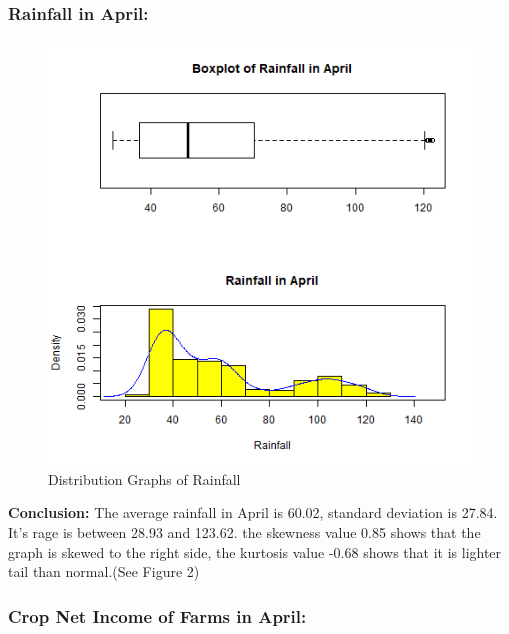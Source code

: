 \documentclass[12pt, a4paper]{article}
\begin{document}
\justify
\subsubsection{Rainfall in April:}

\begin{figure}[H]
\centering
\includegraphics[trim={0 0 0 2cm}, scale=0.6, clip]{RainFall.png}
\caption{Distribution Graphs of Rainfall}
\end{figure}

\justify
\textbf{Conclusion: }  The average rainfall in April is 60.02, standard deviation is 27.84. It's rage is between 28.93 and 123.62. the skewness value 0.85 shows that the graph is skewed to the right side, the kurtosis value -0.68 shows that it is lighter tail than normal.(See Figure 2) 
\newpage
\justify
\subsubsection{Crop Net Income of Farms in April:}
\end{document}
